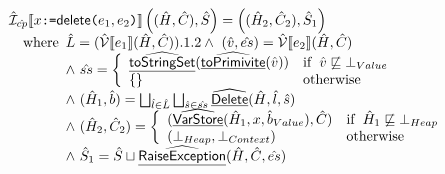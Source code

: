 \[\begin{array}{ll}
\hat{\mathcal{I}} _{\hat{cp}}\llbracket x \mbox{\texttt{:=}} \mbox{\textsf{delete}}\mbox{\texttt{(}}e_1,e_2\mbox{\texttt{)}} \rrbracket \left((\hat{H},\hat{C}),\hat{S}\right)
 = \left((\hat{H}_2,\hat{C}_2),\hat{S}_1\right) \\
\quad{\rm where}\begin{array}[t]{l}
  \hat{L}=(\hat{\mathcal{V}}\llbracket e_1\rrbracket(\hat{H},\hat{C})).1.2
  \land\ (\hat{v}, \hat{es}) = \hat{\mathcal{V}}\llbracket e_2\rrbracket(\hat{H},\hat{C}) \\
  \land\ \hat{ss} = 
    \left\{\begin{array}{ll}
      \widehat{\underline{\sf toStringSet}}(\widehat{\underline{\sf toPrimivite}}(\hat{v})) & {\rm if}\begin{array}[t]{l}\hat{v} \not\sqsubseteq \bot_{Value}\end{array} \\
      \{\} & {\rm otherwise} \\
    \end{array}\right. \\
  \land\ (\hat{H}_1,\hat{b}) = \bigsqcup_{\hat{l}\in\hat{L}} \bigsqcup_{\hat{s} \in \hat{ss}} \widehat{\underline{\sf Delete}}(\hat{H},\hat{l},\hat{s}) \\
  \land\ (\hat{H}_2,\hat{C}_2) =
    \left\{\begin{array}{ll}
      (\widehat{\underline{\sf VarStore}}(\hat{H}_1,x,\hat{b}_{Value}),\hat{C}) & {\rm if}\begin{array}[t]{l}\hat{H}_1 \not\sqsubseteq \bot_{Heap}\end{array} \\
      (\bot_{Heap}, \bot_{Context}) & {\rm otherwise} \\
    \end{array}\right. \\
  \land\ \hat{S}_1 = \hat{S}\sqcup\widehat{\underline{\sf RaiseException}}(\hat{H},\hat{C}, \hat{es}) \\
\end{array}\\
\\


\end{array}
\]
